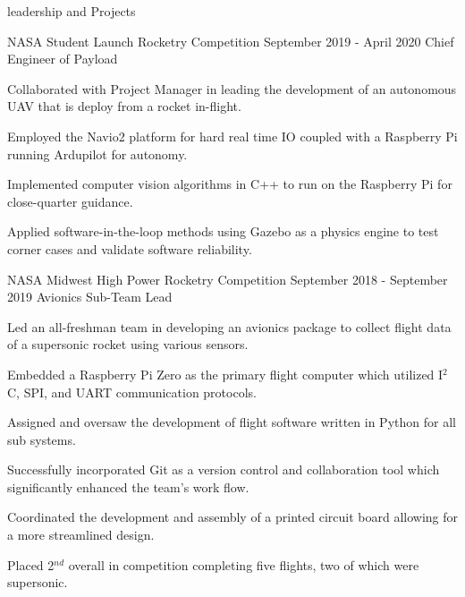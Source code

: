 \documentclass{resume} %
\begin{document}
    \begin{rSection} {leadership and Projects}

        \begin{rSubsection} {NASA Student Launch Rocketry Competition} {September 2019 - April 2020} {Chief Engineer of Payload}

            \item Collaborated with Project Manager in leading the development of an autonomous UAV that is deploy from a rocket in-flight.
            \item Employed the Navio2 platform for hard real time IO coupled with a Raspberry Pi running Ardupilot for autonomy.
            \item Implemented computer vision algorithms in C++ to run on the Raspberry Pi for close-quarter guidance.
            \item Applied software-in-the-loop methods using Gazebo as a physics engine to test corner cases and validate software reliability.


        \end{rSubsection}



        \begin{rSubsection} {NASA Midwest High Power Rocketry Competition} {September 2018 - September 2019} {Avionics Sub-Team Lead}

            \item Led an all-freshman team in developing an avionics package to collect flight data of a supersonic rocket using various sensors.
            \item Embedded a Raspberry Pi Zero as the primary flight computer which utilized I$^2$C, SPI, and UART communication protocols.
            \item Assigned and oversaw the development of flight software written in Python for all sub systems.
            \item Successfully incorporated Git as a version control and collaboration tool which significantly enhanced the team's work flow.
            \item Coordinated the development and assembly of a printed circuit board allowing for a more streamlined design.
            \item Placed 2$^{nd}$ overall in competition completing five flights, two of which were supersonic.

        \end{rSubsection}


\end{rSection}
\end{document}
